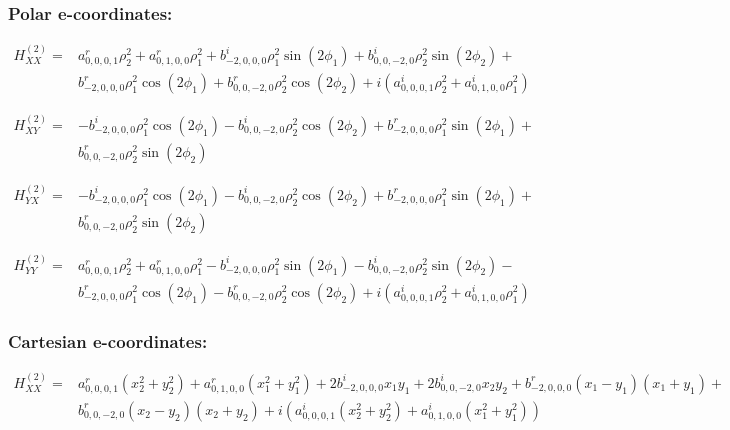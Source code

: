 \documentclass[fleqn]{article}
\begin{document}
\subsubsection*{Polar e-coordinates:}

\begin{align*}
H_{XX}^{(2)}=&a^{r}_{0,0,0,1} \rho_{2}^{2} + a^{r}_{0,1,0,0} \rho_{1}^{2} + b^{i}_{-2,0,0,0} \rho_{1}^{2} \sin (2 \phi_{1}) + b^{i}_{0,0,-2,0} \rho_{2}^{2} \sin (2 \phi_{2}) +\\
& b^{r}_{-2,0,0,0} \rho_{1}^{2} \cos (2 \phi_{1}) + b^{r}_{0,0,-2,0} \rho_{2}^{2} \cos (2 \phi_{2}) + i (a^{i}_{0,0,0,1} \rho_{2}^{2} + a^{i}_{0,1,0,0} \rho_{1}^{2})
\end{align*}

\begin{align*}
H_{XY}^{(2)}=&-  b^{i}_{-2,0,0,0} \rho_{1}^{2} \cos (2 \phi_{1}) -  b^{i}_{0,0,-2,0} \rho_{2}^{2} \cos (2 \phi_{2}) +  b^{r}_{-2,0,0,0} \rho_{1}^{2} \sin (2 \phi_{1}) +\\
&  b^{r}_{0,0,-2,0} \rho_{2}^{2} \sin (2 \phi_{2})
\end{align*}

\begin{align*}
H_{YX}^{(2)}=&-  b^{i}_{-2,0,0,0} \rho_{1}^{2} \cos (2 \phi_{1}) -  b^{i}_{0,0,-2,0} \rho_{2}^{2} \cos (2 \phi_{2}) +  b^{r}_{-2,0,0,0} \rho_{1}^{2} \sin (2 \phi_{1}) +\\
&  b^{r}_{0,0,-2,0} \rho_{2}^{2} \sin (2 \phi_{2})
\end{align*}

\begin{align*}
H_{YY}^{(2)}=& a^{r}_{0,0,0,1} \rho_{2}^{2} +  a^{r}_{0,1,0,0} \rho_{1}^{2} -  b^{i}_{-2,0,0,0} \rho_{1}^{2} \sin (2 \phi_{1}) -  b^{i}_{0,0,-2,0} \rho_{2}^{2} \sin (2 \phi_{2}) -\\
&  b^{r}_{-2,0,0,0} \rho_{1}^{2} \cos (2 \phi_{1}) -  b^{r}_{0,0,-2,0} \rho_{2}^{2} \cos (2 \phi_{2}) +  i (a^{i}_{0,0,0,1} \rho_{2}^{2} + a^{i}_{0,1,0,0} \rho_{1}^{2})
\end{align*}
\subsubsection*{Cartesian e-coordinates:}

\begin{align*}
H_{XX}^{(2)}=&a^{r}_{0,0,0,1} (x_{2}^{2} + y_{2}^{2}) + a^{r}_{0,1,0,0} (x_{1}^{2} + y_{1}^{2}) + 2 b^{i}_{-2,0,0,0} x_{1} y_{1} + 2 b^{i}_{0,0,-2,0} x_{2} y_{2} + b^{r}_{-2,0,0,0} (x_{1} - y_{1}) (x_{1} + y_{1}) +\\
& b^{r}_{0,0,-2,0} (x_{2} - y_{2}) (x_{2} + y_{2}) + i ( a^{i}_{0,0,0,1} (x_{2}^{2} + y_{2}^{2}) +  a^{i}_{0,1,0,0} (x_{1}^{2} + y_{1}^{2}))
\end{align*}
\end{document}
